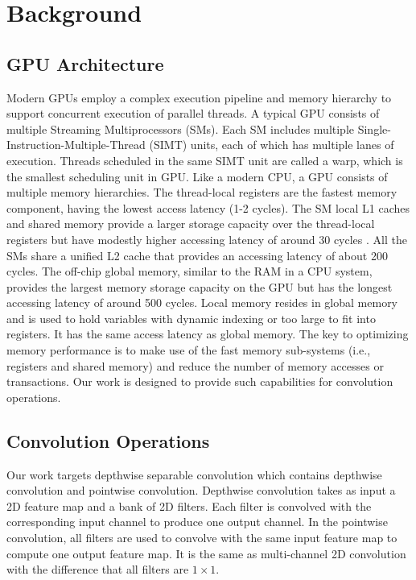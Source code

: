
\section{Background}
\subsection{GPU Architecture}
Modern GPUs employ a complex execution pipeline and memory hierarchy to support concurrent execution of parallel threads. 
A typical GPU consists of multiple Streaming Multiprocessors (SMs). 
Each SM includes multiple Single-Instruction-Multiple-Thread (SIMT) units, each of which has multiple lanes of execution. 
Threads scheduled in the same SIMT unit are called a warp, which is the smallest scheduling unit in GPU. 
Like a modern CPU, a GPU consists of multiple memory hierarchies. 
The thread-local registers are the fastest memory component, having the lowest access latency (1-2 cycles). 
The SM local L1 caches and shared memory provide a larger storage capacity over the thread-local registers but have modestly higher accessing latency of around 30 cycles \cite{mei2016dissecting,jia2018dissecting}. 
All the SMs share a unified L2 cache that provides an accessing latency of about 200 cycles. 
The off-chip global memory, similar to the RAM in a CPU system, provides the largest memory storage capacity on the GPU but has the longest accessing latency of around 500 cycles. 
Local memory resides in global memory and is used to hold variables with dynamic indexing or too large to fit into registers. 
It has the same access latency as global memory. 
The key to optimizing memory performance is to make use of the fast memory sub-systems (i.e., registers and shared memory) and reduce the number of memory accesses or transactions. 
Our work is designed to provide such capabilities for convolution operations.

\subsection{Convolution Operations}
Our work targets depthwise separable convolution which contains depthwise convolution and pointwise convolution. 
Depthwise convolution takes as input a 2D feature map and a bank of 2D filters. Each filter is convolved with the corresponding input channel to produce one output channel. 
In the pointwise convolution, all filters are used to convolve with the same input feature map to compute one output feature map. It is the same as multi-channel 2D convolution with the difference that all filters are $1 \times 1$.


